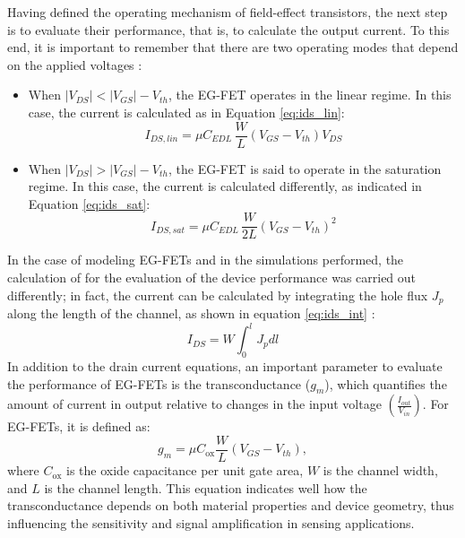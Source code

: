 Having defined the operating mechanism of field-effect transistors, the next step is to evaluate their performance, that is, to calculate the output current. To this end, it is important to remember that there are two operating modes that depend on the applied voltages \citep{shkodraElectrolytegated2021}:

\begin{itemize}
    \item When $\lvert V_{DS} \rvert < \lvert V_{GS} \rvert - V_{th}$, the EG-FET operates in the linear regime. In this case, the current is calculated as in Equation \eqref{eq:ids_lin}:
    \begin{equation}
        \label{eq:ids_lin}
        I_{DS,lin} = \mu C_{EDL}\,\frac{W}{L}\left(V_{GS}-V_{th}\right)V_{DS}
    \end{equation}
    \item When $\lvert V_{DS} \rvert > \lvert V_{GS} \rvert - V_{th}$, the EG-FET is said to operate in the saturation regime. In this case, the current is calculated differently, as indicated in Equation \eqref{eq:ids_sat}:
    \begin{equation}
        \label{eq:ids_sat}
        I_{DS,sat} = \mu C_{EDL}\,\frac{W}{2L}\left(V_{GS}-V_{th}\right)^2
    \end{equation}
\end{itemize}
%
In the case of modeling EG-FETs and in the simulations performed, the calculation of \ids{} for the evaluation of the device performance was carried out differently; in fact, the current can be calculated by integrating the hole flux $J_p$ along the length of the channel, as shown in equation \eqref{eq:ids_int} \citep{newmanElectrochemical2021, chennitInkjetPrinted2023}:
%
\begin{equation}
    \label{eq:ids_int}
    I_{DS} = W \int_{0}^{l}J_p dl
 \end{equation}
%
In addition to the drain current equations, an important parameter to evaluate the performance of EG-FETs is the transconductance ($g_m$), which quantifies the amount of current in output relative to changes in the input voltage $\left(\frac{I_{out}}{V_{in}} \right)$. For EG-FETs, it is defined as:
%
\begin{equation}
    \label{eq:transconductance}
    g_m = \mu C_{\text{ox}} \frac{W}{L} (V_{GS} - V_{th}),
\end{equation}
%
where $C_{\text{ox}}$ is the oxide capacitance per unit gate area, $W$ is the channel width, and $L$ is the channel length. This equation indicates well how the transconductance depends on both material properties and device geometry, thus influencing the sensitivity and signal amplification in sensing applications.


